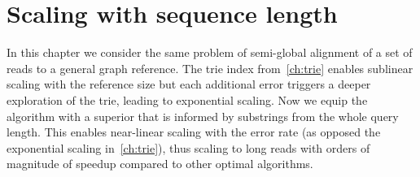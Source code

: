 \chapter{Scaling with sequence length} \label{ch:seed}
\graphicspath{{\dir/}}

In this chapter we consider the same problem of semi-global alignment of a set
of reads to a general graph reference. The trie index from~\cref{ch:trie}
enables sublinear scaling with the reference size but each additional error
triggers a deeper exploration of the trie, leading to exponential scaling. Now
we equip the \A algorithm with a superior \sh that is informed by substrings
from the whole query length. This enables near-linear scaling with the error
rate (as opposed the exponential scaling in~\cref{ch:trie}), thus scaling to
long reads with orders of magnitude of speedup compared to other optimal
algorithms. 






